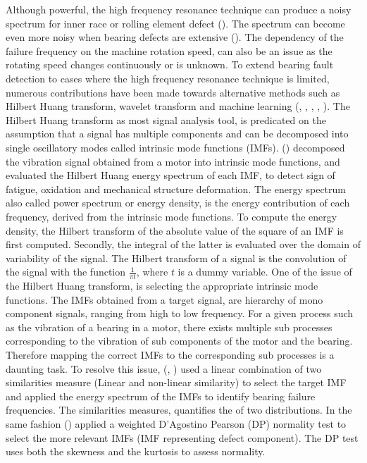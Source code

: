 \documentclass[../Main/thesis.tex]{subfiles}
\begin{document}
\justify
 Although powerful, the high frequency resonance technique can produce a noisy spectrum for inner race or rolling element defect (\cite{mcfadden1984}). The spectrum can become even more noisy when bearing defects are extensive (\cite{mcfadden1984}). The dependency of the failure frequency on the machine rotation speed, can also be an issue as the rotating speed changes continuously or is unknown. 
\justify
 To extend bearing fault detection to cases where the high frequency resonance technique is limited,
numerous contributions have been made towards alternative methods such as Hilbert Huang transform, wavelet transform and machine learning (\cite{zhang2019}, \cite{xiaoan2018}, \cite{rai2016}, \cite{konar2011}, \cite{rai2006} ).
\justify
The Hilbert Huang transform as most signal analysis tool, is predicated on the assumption that a signal has multiple components and can be decomposed into single oscillatory modes called intrinsic mode functions (IMFs). 
(\cite{fan2016}) decomposed the vibration signal obtained from a motor into intrinsic mode functions, and evaluated the Hilbert Huang energy spectrum of each IMF, to detect sign of fatigue, oxidation and mechanical structure deformation. The energy spectrum also called power spectrum or energy density, is the energy contribution of each frequency, derived from the intrinsic mode functions.
To compute the energy density, the Hilbert transform of the absolute value of the square of an IMF is first computed. Secondly, the integral of the latter is evaluated over the domain of variability of the signal. The Hilbert transform of a signal is the convolution of the signal with the function $\frac{1}{\pi t}$, where $t$ is a dummy variable.
\justify
One of the issue of the Hilbert Huang transform, is selecting the appropriate intrinsic mode functions. The IMFs obtained from a target signal, are hierarchy of mono component signals, ranging from high to low frequency. For a given process such as the vibration of a bearing in a motor, there exists multiple sub processes corresponding to the vibration of sub components of the motor and the bearing. Therefore mapping the correct IMFs to the corresponding sub processes is a daunting task. To resolve this issue, (\cite{osman2013a}, \cite{osman2013b} ) used a linear combination of two similarities measure (Linear and non-linear similarity) to select the target IMF and applied the energy spectrum of the IMFs to identify bearing failure frequencies. The similarities measures, quantifies the  of two distributions.
In the same fashion (\cite{osman2014}) applied a weighted D'Agostino Pearson (DP) normality test to select the more relevant IMFs (IMF representing defect component). The DP test uses both the skewness and the kurtosis to assess normality.
\end{document}
